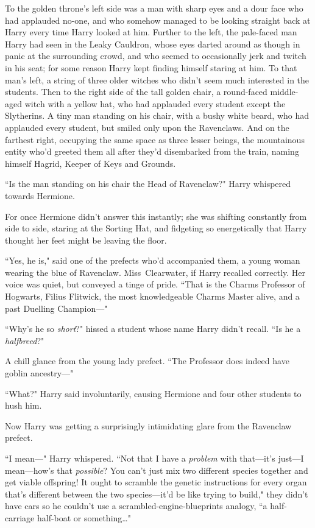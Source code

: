 To the golden throne's left side was a man with sharp eyes and a dour face who had applauded no-one, and who somehow managed to be looking straight back at Harry every time Harry looked at him. Further to the left, the pale-faced man Harry had seen in the Leaky Cauldron, whose eyes darted around as though in panic at the surrounding crowd, and who seemed to occasionally jerk and twitch in his seat; for some reason Harry kept finding himself staring at him. To that man's left, a string of three older witches who didn't seem much interested in the students. Then to the right side of the tall golden chair, a round-faced middle-aged witch with a yellow hat, who had applauded every student except the Slytherins. A tiny man standing on his chair, with a bushy white beard, who had applauded every student, but smiled only upon the Ravenclaws. And on the farthest right, occupying the same space as three lesser beings, the mountainous entity who'd greeted them all after they'd disembarked from the train, naming himself Hagrid, Keeper of Keys and Grounds.

``Is the man standing on his chair the Head of Ravenclaw?" Harry whispered towards Hermione.

For once Hermione didn't answer this instantly; she was shifting constantly from side to side, staring at the Sorting Hat, and fidgeting so energetically that Harry thought her feet might be leaving the floor.

``Yes, he is," said one of the prefects who'd accompanied them, a young woman wearing the blue of Ravenclaw. Miss~Clearwater, if Harry recalled correctly. Her voice was quiet, but conveyed a tinge of pride. ``That is the Charms Professor of Hogwarts, Filius Flitwick, the most knowledgeable Charms Master alive, and a past Duelling Champion—"

``Why's he so \emph{short}?" hissed a student whose name Harry didn't recall. ``Is he a \emph{halfbreed}?"

A chill glance from the young lady prefect. ``The Professor does indeed have goblin ancestry—"

``What?" Harry said involuntarily, causing Hermione and four other students to hush him.

Now Harry was getting a surprisingly intimidating glare from the Ravenclaw prefect.

``I mean—" Harry whispered. ``Not that I have a \emph{problem} with that—it's just—I mean—how's that \emph{possible}? You can't just mix two different species together and get viable offspring! It ought to scramble the genetic instructions for every organ that's different between the two species—it'd be like trying to build," they didn't have cars so he couldn't use a scrambled-engine-blueprints analogy, ``a half-carriage half-boat or something{\ldots}"

